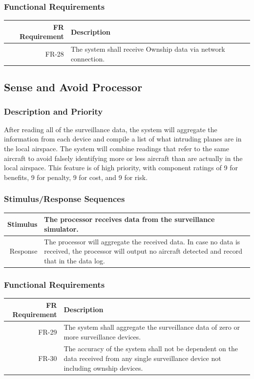 \documentclass[12pt,oneside,letterpaper]{article}
\begin{document}
\subsubsection{Functional Requirements}
\begin{longtable}{|r|p{3.8in}|}
\hline
FR Requirement & Description \\
\hline
FR-28 & The system shall receive Ownship data via network connection. \\
\hline
\end{longtable}

\subsection{Sense and Avoid Processor}
\subsubsection{Description and Priority}
After reading all of the surveillance data, the system will aggregate the information from each device and compile a list of what intruding planes are in the local airspace. The system will combine readings that refer to the same aircraft to avoid falsely identifying more or less aircraft than are actually in the local airspace. This feature is of high priority, with component ratings of 9 for benefits, 9 for penalty, 9 for cost, and 9 for risk.
\subsubsection{Stimulus/Response Sequences}
\begin{longtable}{|r|p{3.8in}|}
\hline
Stimulus & The processor receives data from the surveillance simulator. \\
\hline
Response & The processor will aggregate the received data. In case no data is received, the processor will output no aircraft detected and record that in the data log. \\
\hline
\end{longtable}
\subsubsection{Functional Requirements}
\begin{longtable}{|r|p{3.8in}|}
\hline
FR Requirement & Description \\
\hline
FR-29 & The system shall aggregate the surveillance data of zero or more surveillance devices. \\
\hline
FR-30 & The accuracy of the system shall not be dependent on the data received from any single surveillance device not including ownship devices. \\
\hline
\end{longtable}
\end{document}
